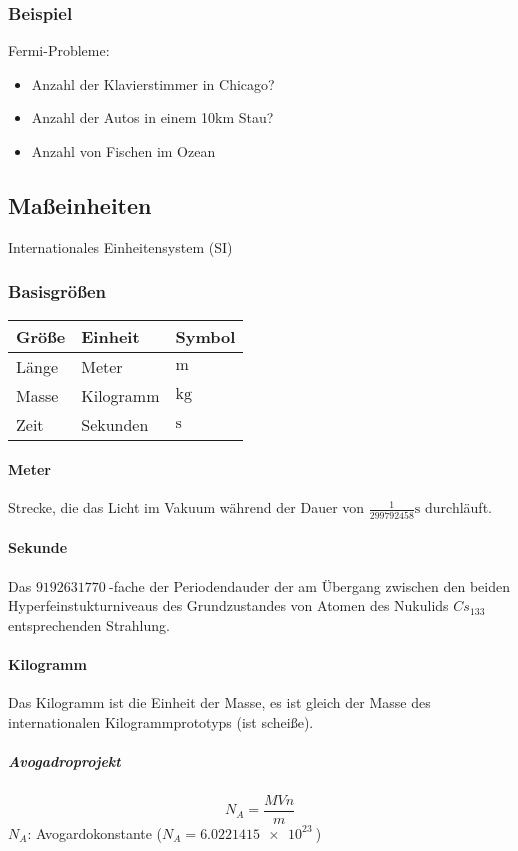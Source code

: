 \documentclass[a4paper]{scrartcl}
\begin{document}
\subsubsection{Beispiel}
\label{sec-6-1-1}
Fermi-Probleme:
\begin{itemize}
\item Anzahl der Klavierstimmer in Chicago?
\item Anzahl der Autos in einem 10km Stau?
\item Anzahl von Fischen im Ozean
\end{itemize}

\subsection{Maßeinheiten}
\label{sec-6-2}
Internationales Einheitensystem (SI)
\subsubsection{Basisgrößen}
\label{sec-6-2-1}
\begin{center}
\begin{tabular}{lll}
Größe & Einheit & Symbol\\
\hline
Länge & Meter & $\si{\meter}$\\
Masse & Kilogramm & $\si{\kg}$\\
Zeit & Sekunden & $\si{\second}$\\
\end{tabular}
\end{center}
\paragraph{Meter}
\label{sec-6-2-1-1}
Strecke, die das Licht im Vakuum während der Dauer von $\frac{1}{299792458}\si{\second}$ durchläuft.
\paragraph{Sekunde}
\label{sec-6-2-1-2}
Das $\SI{9192631770}{}$-fache  der Periodendauder der am Übergang zwischen den beiden Hyperfeinstukturniveaus des Grundzustandes von Atomen des Nukulids $Cs_{133}$ entsprechenden Strahlung.
\paragraph{Kilogramm}
\label{sec-6-2-1-3}
Das Kilogramm ist die Einheit der Masse, es ist gleich der Masse des internationalen Kilogrammprototyps (ist scheiße).
\subparagraph{Avogadroprojekt}
\label{sec-6-2-1-3-1}
\[N_A = \frac{M V n}{m}\]
$N_A$: Avogardokonstante ($N_A = \SI{6.0221415e23}{}$)
\end{document}
